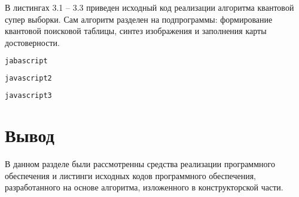 В листингах 3.1 -- 3.3 приведен исходный код реализации алгоритма квантовой супер выборки. Сам алгоритм разделен на подпрограммы: формирование квантовой поисковой таблицы, синтез изображения и заполнения карты достоверности. 


\begin{lstlisting}[label=qtable,caption=Функция формирования квантовой поисковой таблицы, language=javascript]
jabascript
\end{lstlisting}

\begin{lstlisting}[label=synt,caption=Функция синтеза изображения на основе значений поисковой таблицы, language=javascript]
javascript2
\end{lstlisting}

\begin{lstlisting}[label=qfind,caption=Функция заполнения карты достоверности, language=javascript]
javascript3
\end{lstlisting}

\section*{Вывод}

В данном разделе были рассмотренны средства реализации программного обеспечения и листинги исходных кодов программного обеспечения, разработанного на основе алгоритма, изложенного в конструкторской части.
